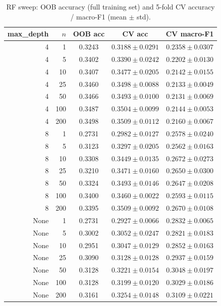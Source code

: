 \documentclass[11pt]{article}
\begin{document}
\begin{table}[H]\centering\small
\caption{RF sweep: OOB accuracy (full training set) and 5-fold CV accuracy / macro-F1 (mean $\pm$ std).}\label{tab:sweep}
\begin{tabular}{@{}rrccc@{}}
\toprule
max\_depth & $n$ & OOB acc & CV acc & CV macro-F1 \\
\midrule
4 & 1 & 0.3243 & $0.3188\pm0.0291$ & $0.2358\pm0.0307$ \\
4 & 5 & 0.3402 & $0.3390\pm0.0242$ & $0.2202\pm0.0130$ \\
4 & 10 & 0.3407 & $0.3477\pm0.0205$ & $0.2142\pm0.0155$ \\
4 & 25 & 0.3460 & $0.3498\pm0.0088$ & $0.2133\pm0.0049$ \\
4 & 50 & 0.3466 & $0.3493\pm0.0100$ & $0.2131\pm0.0069$ \\
4 & 100 & 0.3487 & $0.3504\pm0.0099$ & $0.2144\pm0.0053$ \\
4 & 200 & 0.3498 & $0.3509\pm0.0112$ & $0.2160\pm0.0067$ \\
\midrule
8 & 1 & 0.2731 & $0.2982\pm0.0127$ & $0.2578\pm0.0240$ \\
8 & 5 & 0.3123 & $0.3297\pm0.0205$ & $0.2562\pm0.0163$ \\
8 & 10 & 0.3308 & $0.3449\pm0.0135$ & $0.2672\pm0.0273$ \\
8 & 25 & 0.3210 & $0.3471\pm0.0160$ & $0.2650\pm0.0300$ \\
8 & 50 & 0.3324 & $0.3493\pm0.0146$ & $0.2647\pm0.0208$ \\
8 & 100 & 0.3400 & $0.3460\pm0.0022$ & $0.2593\pm0.0115$ \\
8 & 200 & 0.3395 & $0.3509\pm0.0092$ & $0.2670\pm0.0108$ \\
\midrule
None & 1 & 0.2731 & $0.2927\pm0.0066$ & $0.2832\pm0.0065$ \\
None & 5 & 0.3002 & $0.3052\pm0.0247$ & $0.2821\pm0.0183$ \\
None & 10 & 0.2951 & $0.3047\pm0.0129$ & $0.2852\pm0.0163$ \\
None & 25 & 0.3090 & $0.3128\pm0.0128$ & $0.2937\pm0.0159$ \\
None & 50 & 0.3128 & $0.3221\pm0.0154$ & $0.3048\pm0.0197$ \\
None & 100 & 0.3128 & $0.3199\pm0.0120$ & $0.3029\pm0.0186$ \\
\rowcolor{gray!20}None & 200 & 0.3161 & $0.3254\pm0.0148$ & $0.3109\pm0.0221$ \\
\bottomrule
\end{tabular}
\end{table}
\end{document}
